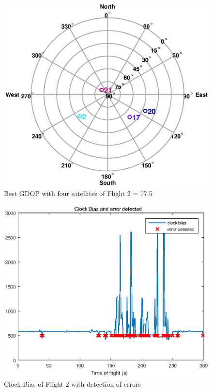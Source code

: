 \documentclass[Space3_Assign2]{subfile}
\begin{document}
\begin{figure}
\centering
\includegraphics[width=0.7\linewidth]{1Cbest4.eps}
\caption{Best GDOP with four satellites of Flight 2 = 77.5}
\label{fig:1Cbest4}
\end{figure}
\begin{figure}
\centering
\includegraphics[width=0.7\linewidth]{1cerrorandclock.eps}
\caption{Clock Bias of Flight 2 with detection of errors}
\label{fig:1cclockbias}
\end{figure}
\end{document}
